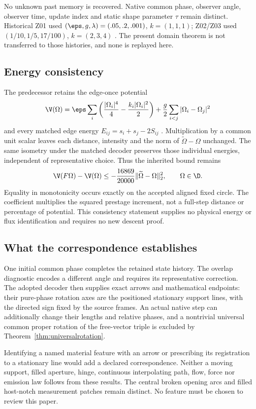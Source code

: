 No unknown past memory is recovered. Native common phase, observer angle, observer time, update index and static shape parameter \(\tau\) remain distinct. Historical Z01 used \((\eps,g,\lambda)=(.05,.2,.001)\), \(k=(1,1,1)\); Z02/Z03 used \((1/10,1/5,17/100)\), \(k=(2,3,4)\) \cite[Section 2]{zmethods}. The present domain theorem is not transferred to those histories, and none is replayed here.

\subsection{Energy consistency}
The predecessor retains the edge-once potential
\[
\V(\Omega)=\eps\sum_i\left(\frac{|\Omega_i|^4}{4}-\frac{k_i|\Omega_i|^2}{2}\right)
+\frac g2\sum_{i<j}|\Omega_i-\Omega_j|^2
\]
and every matched edge energy \(E_{ij}=s_i+s_j-2S_{ij}\) \cite[Sections 4 and 6]{potential}. Multiplication by a common unit scalar leaves each distance, intensity and the norm of \(\widetilde\Omega-\Omega\) unchanged. The same isometry under the matched decoder preserves those individual energies, independent of representative choice. Thus the inherited bound remains
\begin{equation}
\V(F\Omega)-\V(\Omega)
\le-\frac{16869}{20000}\|\widetilde\Omega-\Omega\|_2^2,
\qquad \Omega\in\D.
\label{eq:energyconsistency}
\end{equation}
Equality in monotonicity occurs exactly on the accepted aligned fixed circle. The coefficient multiplies the squared prestage increment, not a full-step distance or percentage of potential. This consistency statement supplies no physical energy or flux identification and requires no new descent proof.

\subsection{What the correspondence establishes}
One initial common phase completes the retained state history. The overlap diagnostic encodes a different angle and requires its representative correction. The adopted decoder then supplies exact arrows and mathematical endpoints: their pure-phase rotation axes are the positioned stationary support lines, with the directed sign fixed by the source frames. An actual native step can additionally change their lengths and relative phases, and a nontrivial universal common proper rotation of the free-vector triple is excluded by Theorem~\ref{thm:universalrotation}.

Identifying a named material feature with an arrow or prescribing its registration to a stationary line would add a declared correspondence. Neither a moving support, filled aperture, hinge, continuous interpolating path, flow, force nor emission law follows from these results. The central broken opening arcs and filled host-notch measurement patches remain distinct. No feature must be chosen to review this paper.

